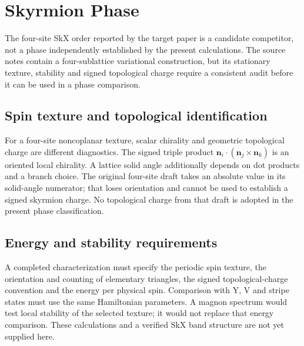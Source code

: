 \clearpage

\section{Skyrmion Phase}\label{sec-nbcp-skyrmion}

The four-site SkX order reported by the target paper is a candidate
competitor, not a phase independently established by the present
calculations. The source notes contain a four-sublattice variational
construction, but its stationary texture, stability and signed
topological charge require a consistent audit before it can be used in a
phase comparison.

\subsection{Spin texture and topological
identification}\label{spin-texture-and-topological-identification}

For a four-site noncoplanar texture, scalar chirality and geometric
topological charge are different diagnostics. The signed triple product
\(\mathbf n_i\cdot(\mathbf n_j\times\mathbf n_k)\) is an oriented local
chirality. A lattice solid angle additionally depends on dot products
and a branch choice. The original four-site draft takes an absolute
value in its solid-angle numerator; that loses orientation and cannot be
used to establish a signed skyrmion charge. No topological charge from
that draft is adopted in the present phase classification.

\subsection{Energy and stability
requirements}\label{energy-and-stability-requirements}

A completed characterization must specify the periodic spin texture, the
orientation and counting of elementary triangles, the signed
topological-charge convention and the energy per physical spin.
Comparison with Y, V and stripe states must use the same Hamiltonian
parameters. A magnon spectrum would test local stability of the selected
texture; it would not replace that energy comparison. These calculations
and a verified SkX band structure are not yet supplied here.
